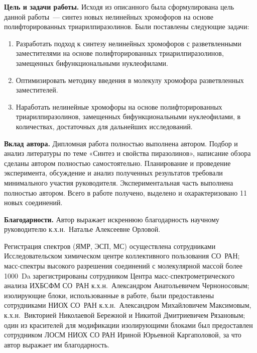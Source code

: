 \textbf{Цель и задачи работы.}
Исходя из описанного была сформулирована цель данной работы~--- синтез новых нелинейных хромофоров на основе полифторированных триарилпиразолинов.
Были поставлены следующие задачи:
\begin{enumerate}
    \item Разработать подход к синтезу нелинейных хромофоров с разветвленными заместителями на основе полифторированных триарилпиразолинов, замещенных бифункциональными нуклеофилами.
    \item Оптимизировать методику введения в молекулу хромофора разветвленных заместителей.
    \item Наработать нелинейные хромофоры на основе полифторированных триарилпиразолинов, замещенных бифункциональными нуклеофилами, в количествах, достаточных для дальнейших исследований.
\end{enumerate}

\textbf{Вклад автора.}
Дипломная работа полностью выполнена автором.
Подбор и анализ литературы по теме «Синтез и свойства пиразолинов», написание обзора сделаны автором полностью самостоятельно.
Планирование и проведение эксперимента, обсуждение и анализ полученных результатов требовали минимального участия руководителя.
Экспериментальная часть выполнена полностью автором.
Всего в работе получено, выделено и охарактеризовано 11 новых соединений.

\textbf{Благодарности.}
Автор выражает искреннюю благодарность научному руководителю к.х.н.~Наталье Алексеевне Орловой.

Регистрация спектров (ЯМР, ЭСП, МС) осуществлена сотрудниками Исследовательском химическом центре коллективного пользования СО~РАН; масс-спектры высокого разрешения соединений с молекулярной массой более \SI{1000}{\dalton} зарегистрированы сотрудником Центра масс-спектрометрического анализа ИХБСФМ СО~РАН к.х.н.~Александром Анатольевичем Черноносовым; изолирующие блоки, использованные в работе, были предоставлены сотрудниками НИОХ СО~РАН к.х.н.~Александром Михайловичем Максимовым, к.х.н.~Викторией Николаевой Бережной и Никитой Дмитриевичем Рязановым; один из красителей для модификации изолирующими блоками был предоставлен сотрудником ЛОСМ НИОХ СО РАН Ириной Юрьевной Каргаполовой, за что автор выражает им благодарность.



